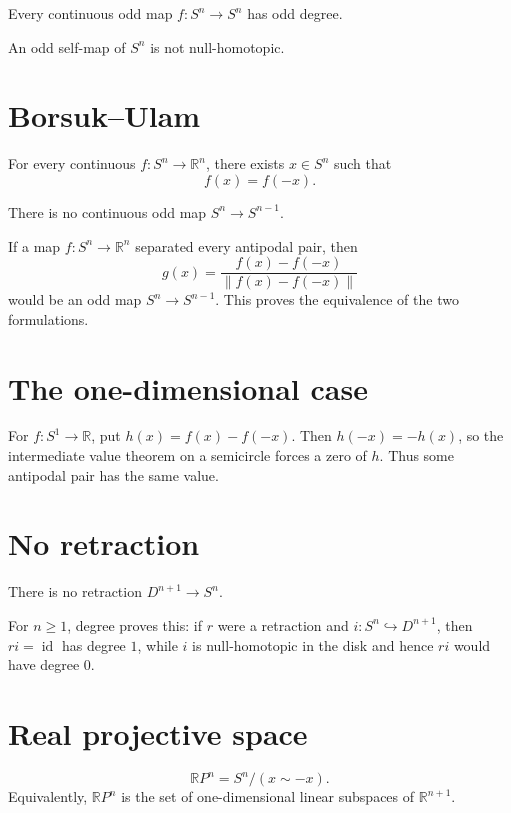 \begin{theorem}\label{thm:viii04-odd-degree}
Every continuous odd map \(f:S^n\to S^n\) has odd degree.
\end{theorem}

\begin{corollary}\label{cor:viii04-odd-nonnull}
An odd self-map of \(S^n\) is not null-homotopic.
\end{corollary}

\section{Borsuk--Ulam}
\begin{theorem}\label{thm:viii04-borsuk-ulam}
For every continuous \(f:S^n\to\mathbb R^n\), there exists \(x\in S^n\) such
that
\[
f(x)=f(-x).
\]
\end{theorem}

\begin{theorem}\label{thm:viii04-no-odd-lower}
There is no continuous odd map \(S^n\to S^{n-1}\).
\end{theorem}

If a map \(f:S^n\to\mathbb R^n\) separated every antipodal pair, then
\[
g(x)=\frac{f(x)-f(-x)}{\|f(x)-f(-x)\|}
\]
would be an odd map \(S^n\to S^{n-1}\).  This proves the equivalence of the
two formulations.

\section{The one-dimensional case}
For \(f:S^1\to\mathbb R\), put \(h(x)=f(x)-f(-x)\).  Then
\(h(-x)=-h(x)\), so the intermediate value theorem on a semicircle forces a
zero of \(h\).  Thus some antipodal pair has the same value.

\section{No retraction}
\begin{theorem}\label{thm:viii04-no-retraction}
There is no retraction \(D^{n+1}\to S^n\).
\end{theorem}
For \(n\ge1\), degree proves this: if \(r\) were a retraction and
\(i:S^n\hookrightarrow D^{n+1}\), then \(ri=\operatorname{id}\) has degree
\(1\), while \(i\) is null-homotopic in the disk and hence \(ri\) would have
degree \(0\).

\section{Real projective space}
\begin{definition}\label{def:viii04-rpn}
\[
\mathbb RP^n=S^n/(x\sim -x).
\]
Equivalently, \(\mathbb RP^n\) is the set of one-dimensional linear subspaces
of \(\mathbb R^{n+1}\).
\end{definition}

